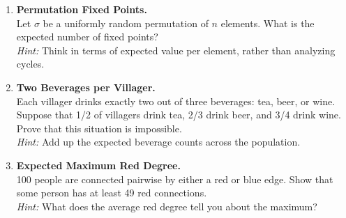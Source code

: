 {\begin{enumerate}
    \item \textbf{Permutation Fixed Points.}\\
    Let \( \sigma \) be a uniformly random permutation of \( n \) elements. What is the expected number of fixed points?\\[0.5em]
    \textit{Hint:} Think in terms of expected value per element, rather than analyzing cycles.

    \item \textbf{Two Beverages per Villager.}\\
    Each villager drinks exactly two out of three beverages: tea, beer, or wine. Suppose that 1/2 of villagers drink tea, 2/3 drink beer, and 3/4 drink wine. Prove that this situation is impossible.\\[0.5em]
    \textit{Hint:} Add up the expected beverage counts across the population.

    \item \textbf{Expected Maximum Red Degree.}\\
    100 people are connected pairwise by either a red or blue edge. Show that some person has at least 49 red connections.\\[0.5em]
    \textit{Hint:} What does the average red degree tell you about the maximum?

\end{enumerate}

\noindent\hrulefill

\begin{center}
\end{center}
}
